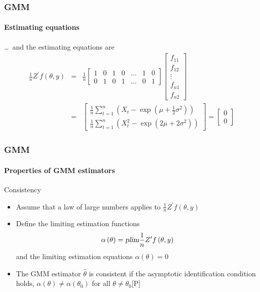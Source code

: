 \documentclass{beamer}
\begin{document}
\begin{frame}\frametitle{GMM}\framesubtitle{Estimating equations}
\begin{example}[contd]
    \ldots\ and the estimating equations are
    \begin{eqnarray*}
    \frac{1}{n}Z^{\prime }f(\theta ,y) &=&\frac{1}{n}\left[
    \begin{array}{lllllll}
    1 & 0 & 1 & 0 & \ldots & 1 & 0 \\
    0 & 1 & 0 & 1 & \ldots & 0 & 1
    \end{array}
    \right] \left[
    \begin{array}{c}
    f_{11} \\
    f_{12} \\
    \vdots \\
    f_{n1} \\
    f_{n2}%
    \end{array}
    \right] \\
    &=&\left[
    \begin{array}{c}
    \frac{1}{n}\sum_{t=1}^{n}\left( X_{t}-\exp \left( \mu +\frac{1}{2}\sigma
    ^{2}\right) \right) \\
    \frac{1}{n}\sum_{t=1}^{n}\left( X_{t}^{2}-\exp \left( 2\mu +2\sigma
    ^{2}\right) \right)
    \end{array}
    \right] =\left[
    \begin{array}{c}
    0 \\
    0
    \end{array}
    \right]
    \end{eqnarray*}
\end{example}
\end{frame}


\begin{frame}\frametitle{GMM}\framesubtitle{Properties of GMM estimators}
Consistency
\begin{itemize}
    \item Assume that a law of large numbers applies to $\frac{1}{n}Z^{\prime}f(\theta ,y)$
    \item Define the limiting estimation functions
    \begin{equation*}
    \alpha \left( \theta \right) =\textsl{plim}\frac{1}{n}Z^{\prime }f\left(\theta ,y\right)
    \end{equation*}
    and the limiting estimation equations $\alpha \left( \theta \right) =0$
    \item The GMM estimator $\hat{\theta}$ is consistent if the asymptotic identification condition holds, $\alpha \left( \theta \right) \neq \alpha \left( \theta _{0}\right) $ for all $\theta \neq \theta _{0}$\hfill [P]
\end{itemize}
\end{frame}
\end{document}
